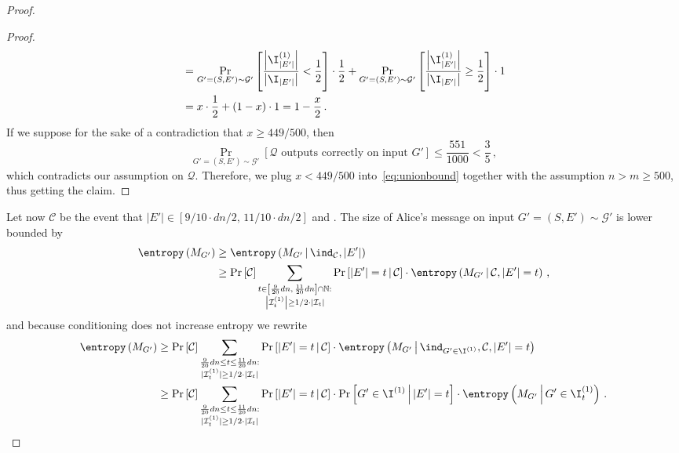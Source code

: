 \begin{proof}
\begin{proof}
\begin{align*}
		 	& = \Pr_{G'=(S,E') \sim \mathcal{G}'}\left[  \frac{\left|\I_{|E'|}^{(1)}\right|}{\left|\I_{|E'| }\right|} < \frac{1}{2} \right] \cdot \frac{1}{2} + \Pr_{G'=(S,E') \sim \mathcal{G}'}\left[ \frac{\left|\I_{|E'|}^{(1)}\right|}{\left|\I_{|E'| }\right|} \ge \frac{1}{2}\right] \cdot 1\\
		 	& = x \cdot \frac{1}{2} + (1-x) \cdot 1 = 1-\frac{x}{2}\, .
		 \end{align*}
		 If we suppose for the sake of a contradiction that $x \ge 449/500$, then
		 \begin{equation*}
		 	\Pr_{G'=(S,E') \sim \mathcal{G}'}\left[\mathcal{Q} \text{ outputs correctly on input } G'\right] \le \frac{551}{1000} < \frac{3}{5} \, ,
		 \end{equation*}
		 which contradicts our assumption on $\mathcal{Q}$. Therefore, we plug $x < 449/500$ into~\eqref{eq:unionbound} together with the assumption $n > m \ge 500$, thus  getting the claim.
	\end{proof}
	\noindent
	Let now $\mathcal{C}$ be the event that $|E'| \in [9/10 \cdot dn/2 , \, 11/10 \cdot dn/2]$ and  .
	The size of Alice's message on input $G'=(S,E') \sim \mathcal{G}'$ is lower bounded by
	\begin{align*}
			\entropy\left(M_{G'}\right)
			& \ge \entropy\left(M_{G'} \, \middle| \, \ind_{ \mathcal{C}}, |E'|\right)  \\
			& \ge\Pr\left[  \mathcal{C} \right]    \sum_{\substack{t \in  \left[\frac{9}{20}dn , \, \frac{11}{20}dn\right] \cap \mathbb{N}:\\ \left|\mathcal{I}^{(1)}_{t}\right| \ge {1}/{2} \cdot \left|\mathcal{I}_t\right| } } \Pr\left[|E'|=t \, \middle| \, \mathcal{C} \right] \cdot \entropy\left(M_{G'} \, \middle| \, {\mathcal{C}}, |E'|=t\right) \,,
		\end{align*}
		and because conditioning does not increase entropy we rewrite
		\begin{align*}
				\entropy\left(M_{G'}\right) & \ge\Pr\left[  \mathcal{C} \right]     \sum_{\substack{\frac{9}{20}dn \le t \le  \frac{11}{20}dn :\\ |\mathcal{I}^{(1)}_{t}| \ge {1}/{2} \cdot |\mathcal{I}_t| } }\Pr\left[|E'|=t \, \middle| \, \mathcal{C} \right] \cdot \entropy\left(M_{G'} \, \middle| \, \ind_{G' \in  \I^{(1)}} ,{\mathcal{C}}, |E'|=t\right)  \\
			& \ge\Pr\left[  \mathcal{C} \right]     \sum_{\substack{\frac{9}{20}dn \le t \le  \frac{11}{20}dn:\\ |\mathcal{I}^{(1)}_{t}| \ge {1}/{2} \cdot |\mathcal{I}_t| } }\Pr\left[|E'|=t \, \middle| \, \mathcal{C} \right] \cdot \Pr\left[G' \in  \I^{(1)} \, \middle| \,  |E'|=t\right] \cdot\entropy\left(M_{G'} \, \middle| \, { G' \in \I_t^{(1)}}\right) \, .

\end{align*}
\end{proof}
